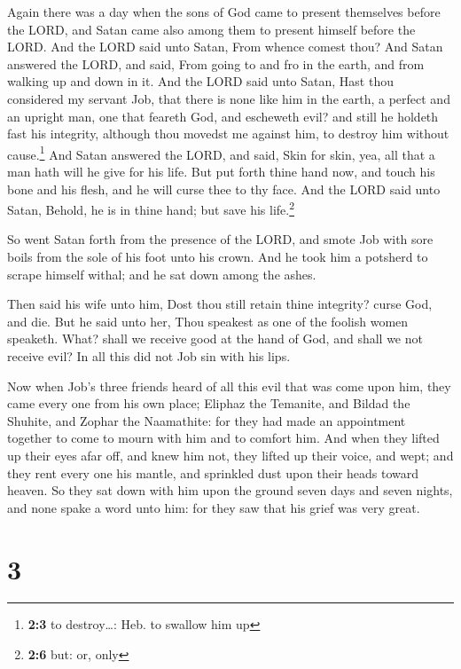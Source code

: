  Again there was a day when the sons of God came to
present themselves before the LORD, and Satan came also among them to
present himself before the LORD.  And the LORD said unto
Satan, From whence comest thou? And Satan answered the LORD, and said,
From going to and fro in the earth, and from walking up and down in it.
 And the LORD said unto Satan, Hast thou considered my
servant Job, that there is none like him in the earth, a perfect and an
upright man, one that feareth God, and escheweth evil? and still he
holdeth fast his integrity, although thou movedst me against him, to
destroy him without cause.\footnote{\textbf{2:3} to destroy\ldots: Heb.
  to swallow him up}  And Satan answered the LORD, and
said, Skin for skin, yea, all that a man hath will he give for his life.
 But put forth thine hand now, and touch his bone and his
flesh, and he will curse thee to thy face.  And the LORD
said unto Satan, Behold, he is in thine hand; but save his
life.\footnote{\textbf{2:6} but: or, only}

 So went Satan forth from the presence of the LORD, and
smote Job with sore boils from the sole of his foot unto his crown.
 And he took him a potsherd to scrape himself withal; and
he sat down among the ashes.

 Then said his wife unto him, Dost thou still retain thine
integrity? curse God, and die.  But he said unto her,
Thou speakest as one of the foolish women speaketh. What? shall we
receive good at the hand of God, and shall we not receive evil? In all
this did not Job sin with his lips.

 Now when Job's three friends heard of all this evil that
was come upon him, they came every one from his own place; Eliphaz the
Temanite, and Bildad the Shuhite, and Zophar the Naamathite: for they
had made an appointment together to come to mourn with him and to
comfort him.  And when they lifted up their eyes afar
off, and knew him not, they lifted up their voice, and wept; and they
rent every one his mantle, and sprinkled dust upon their heads toward
heaven.  So they sat down with him upon the ground seven
days and seven nights, and none spake a word unto him: for they saw that
his grief was very great.

\hypertarget{section-2}{%
\section{3}\label{section-2}}


